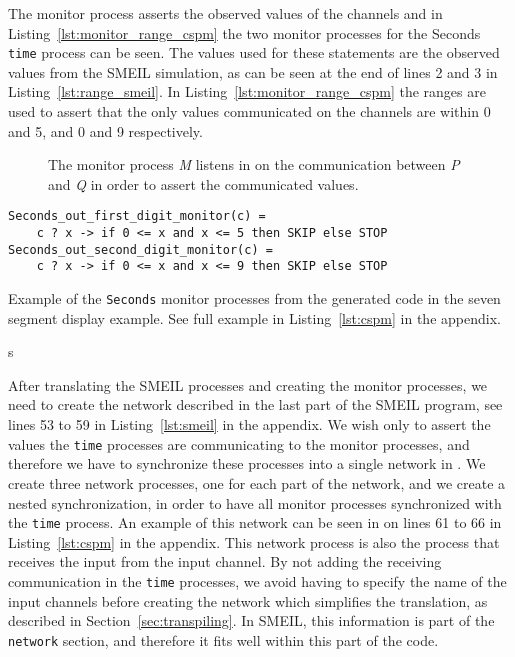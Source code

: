 The monitor process asserts the observed values of the \cspm{} channels and in Listing~\ref{lst:monitor_range_cspm} the two monitor processes for the Seconds \texttt{time} process can be seen. The values used for these statements are the observed values from the SMEIL simulation, as can be seen at the end of lines 2 and 3 in Listing~\ref{lst:range_smeil}. In Listing~\ref{lst:monitor_range_cspm} the ranges are used to assert that the only values communicated on the channels are within 0 and 5, and 0 and 9 respectively.

\begin{figure}[!ht]
  \centering
  \caption{The monitor process \textit{M} listens in on the communication between \textit{P} and \textit{Q} in order to assert the communicated values.}
  \label{fig:assertion_process}
\end{figure}

\begin{listing}
\begin{verbatim}
Seconds_out_first_digit_monitor(c) =
    c ? x -> if 0 <= x and x <= 5 then SKIP else STOP
Seconds_out_second_digit_monitor(c) =
    c ? x -> if 0 <= x and x <= 9 then SKIP else STOP
\end{verbatim}
\caption{Example of the \texttt{Seconds} monitor processes from the generated \cspm{} code in the seven segment display example. See full example in Listing~\ref{lst:cspm} in the appendix.}
\label{lst:monitor_range_cspm}
\end{listing}
s

After translating the SMEIL processes and creating the monitor processes, we need to create the network described in the last part of the SMEIL program, see lines 53 to 59 in Listing~\ref{lst:smeil} in the appendix. We wish only to assert the values the \texttt{time} processes are communicating to the monitor processes, and therefore we have to synchronize these processes into a single network in \cspm{}. We create three network processes, one for each part of the network, and we create a nested synchronization, in order to have all monitor processes synchronized with the \texttt{time} process. An example of this network can be seen in on lines 61 to 66 in Listing~\ref{lst:cspm} in the appendix. This network process is also the process that receives the input from the input channel. By not adding the receiving communication in the \texttt{time} processes, we avoid having to specify the name of the input channels before creating the network which simplifies the translation, as described in Section~\ref{sec:transpiling}. In SMEIL, this information is part of the \texttt{network} section, and therefore it fits well within this part of the \cspm{} code.

